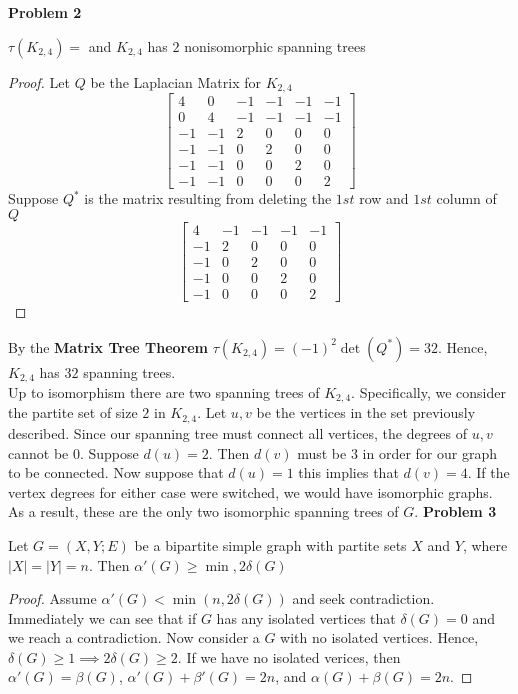 \documentclass{article}
\newenvironment{claim}[2][Claim]{\begin{trivlist}
		\item[\hskip \labelsep {\bfseries #1}\hskip \labelsep {\bfseries #2}]}{\end{trivlist}}
\begin{document}
\noindent \textbf{Problem 2}
\begin{claim}{}
	$\tau(K_{2,4}) = $ and $K_{2,4}$ has $2$ nonisomorphic spanning trees
\end{claim}
\begin{proof}
Let $Q$ be the Laplacian Matrix for $K_{2,4}$ 
\[
\begin{bmatrix}
	4  &  0  & -1 & -1 & -1 & -1 \\
	0  &  4  & -1 & -1 & -1 & -1 \\
	-1 & -1  &  2 &  0 &  0 &  0 \\
	-1 & -1  &  0 &  2 &  0 &  0 \\
	-1 & -1  &  0 &  0 &  2 &  0 \\
	-1 & -1  &  0 &  0 &  0 &  2 
\end{bmatrix}
\]
Suppose $Q^*$ is the matrix resulting from deleting the $1st$ row and $1st$ column of $Q$
\[
\begin{bmatrix}
 4  & -1 & -1 & -1 & -1 \\
-1  &  2 &  0 &  0 &  0 \\
-1  &  0 &  2 &  0 &  0 \\
-1  &  0 &  0 &  2 &  0 \\
-1  &  0 &  0 &  0 &  2 
\end{bmatrix}
\]
\end{proof}
By the \textbf{Matrix Tree Theorem} $\tau(K_{2,4}) = (-1)^2 \det(Q^*) = 32$. Hence, $K_{2,4}$ has $32$ spanning trees. \\
Up to isomorphism there are two spanning trees of $K_{2,4}$. Specifically, we consider the partite set of size $2$ in $K_{2,4}$. Let $u,v$ be the vertices in the set previously described. Since our spanning tree must connect all vertices, the degrees of $u,v$ cannot be $0$. Suppose $d(u) = 2$. Then $d(v)$ must be $3$ in order for our graph to be connected. Now suppose that $d(u) = 1$ this implies that $d(v) = 4$. If the vertex degrees for either case were switched, we would have isomorphic graphs. As a result, these are the only two isomorphic spanning trees of $G$. 
\newpage
\noindent \textbf{Problem 3}
\begin{claim}{}
Let $G = (X,Y ; E)$ be a bipartite simple graph with partite sets $X$ and $Y$, where $|X| = |Y| = n$. Then $\alpha'(G) \geq \min{, 2 \delta(G)}$ 
\end{claim}
\begin{proof}
Assume $\alpha'(G) < \min(n, 2 \delta(G))$ and seek contradiction. Immediately we can see that if $G$ has any isolated vertices that $\delta(G) = 0$ and we reach a contradiction. Now consider a $G$ with no isolated vertices. Hence, $\delta(G) \geq 1 \implies 2\delta(G) \geq 2$. If we have no isolated verices, then $\alpha'(G) = \beta(G)$, $\alpha'(G) + \beta'(G) = 2n$, and $\alpha(G) + \beta(G) = 2n$.
\end{proof}
\end{document}
